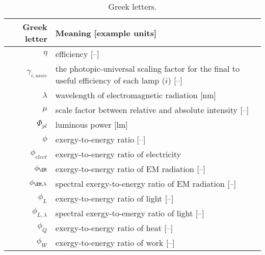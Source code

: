 \begin{table}
\centering %
\caption{Greek letters.}
\begin{tabular}{r l}
  \toprule
  Greek letter & Meaning [example units] \\
  \midrule
  $\eta$ & efficiency [--] \\
  $\gamma_{i,univ}$ & the photopic-universal scaling factor for the final to useful efficiency of each lamp ($i$) [--] \\
  $\lambda$ & wavelength of electromagnetic radiation [nm] \\
  $\mu$ & scale factor between relative and absolute intensity [--] \\
  $\Phi_{pl}$ & luminous power [lm] \\
  $\phi$ & exergy-to-energy ratio [--] \\
  $\phi_{elect}$ & exergy-to-energy ratio of electricity \\
  $\phi_{\EM}$ & exergy-to-energy ratio of EM radiation [--] \\
  $\phi_{\EM,\lambda}$ & spectral exergy-to-energy ratio of EM radiation [--] \\
  $\phi_{L}$ & exergy-to-energy ratio of light [--] \\
  $\phi_{L,\lambda}$ & spectral exergy-to-energy ratio of light [--] \\
  $\phi_{Q}$ & exergy-to-energy ratio of heat [--] \\
  $\phi_{W}$ & exergy-to-energy ratio of work [--] \\
  \bottomrule
\end{tabular}
\label{tab:greek}
\end{table}


  


  
